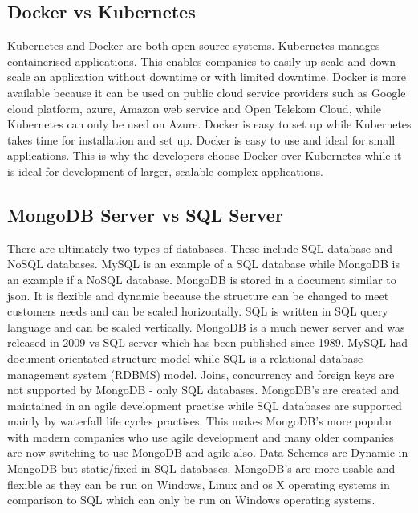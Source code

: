 \subsection{Docker vs Kubernetes}
Kubernetes and Docker are both open-source systems. Kubernetes manages containerised applications. This enables companies to easily up-scale and down scale an application without downtime or with limited downtime. Docker is more available because it can be used on public cloud service providers such as Google cloud platform, azure, Amazon web service and Open Telekom Cloud, while Kubernetes can only be used on Azure. Docker is easy to set up while Kubernetes takes time for installation and set up. Docker is easy to use and ideal for small applications. This is why the developers choose Docker over Kubernetes while it is ideal for development of larger, scalable complex applications.\cite{india_2019}

\subsection{MongoDB Server vs SQL Server}
There are ultimately two types of databases. These include SQL database and NoSQL databases. MySQL is an example of a SQL database while MongoDB is an example if a NoSQL database. MongoDB is stored in a document similar to json. It is flexible and dynamic because the structure can be changed to meet customers needs and can be scaled horizontally. SQL is written in SQL query language and can be scaled vertically. MongoDB is a much newer server and was released in 2009 vs SQL server which has been published since 1989. MySQL had document orientated structure model while SQL is a relational database management system (RDBMS) model. Joins, concurrency and foreign keys are not supported by MongoDB - only SQL databases. MongoDB's are created and maintained in an agile development practise while SQL databases are supported mainly by waterfall life cycles practises. This makes MongoDB's more popular with modern companies who use agile development and many older companies are now switching to use MongoDB and agile also. Data Schemes are Dynamic in MongoDB but static/fixed in SQL databases. MongoDB's are more usable and flexible as they can be run on Windows, Linux and os X operating systems in comparison to SQL which can only be run on Windows operating systems.\cite{mongodb_vs_sql_server_2019}

